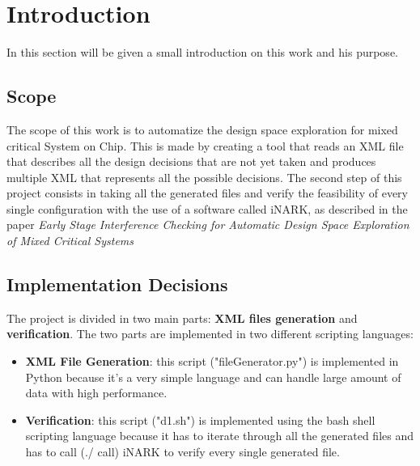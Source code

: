 \documentclass[../main.tex]{subfiles}
\begin{document}
\section{Introduction}
In this section will be given a small introduction on this work and his purpose.
  \subsection{Scope}
  The scope of this work is to automatize the design space exploration for mixed critical System on Chip. This is made by creating a tool that reads an XML file that describes all the design decisions that are not yet taken and produces multiple XML that represents all the possible decisions. The second step of this project consists in taking all the generated files and verify the feasibility of every single configuration with the use of a software called iNARK, as described in the paper \textit{Early Stage Interference Checking for Automatic Design Space Exploration of Mixed Critical Systems}\cite{paper}

  \subsection{Implementation Decisions}
  The project is divided in two main parts: \textbf{XML files generation} and \textbf{verification}. The two parts are implemented in two different scripting languages:
  \begin{itemize}
    \item \textbf{XML File Generation}: this script ("fileGenerator.py") is implemented in Python because it's a very simple language and can handle large amount of data with high performance.
    \item \textbf{Verification}: this script ("d1.sh") is implemented using the bash shell scripting language because it has to iterate through all the generated files and has to call (./ call) iNARK to verify every single generated file.
  \end{itemize}
\end{document}
